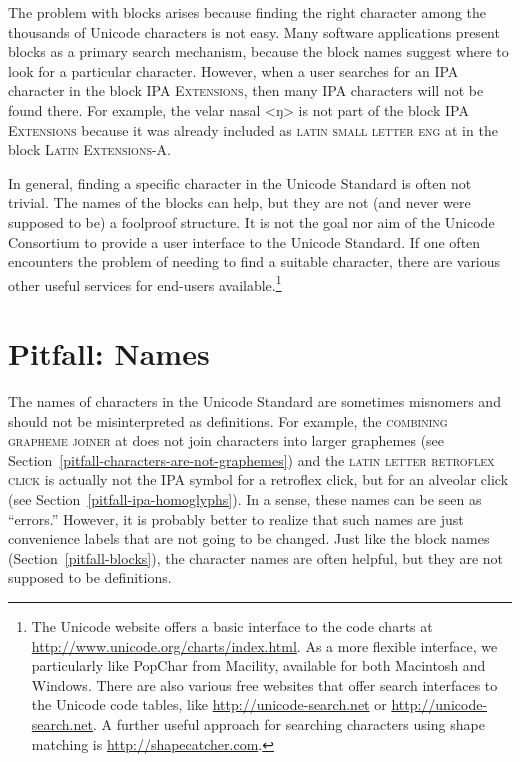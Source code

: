 The problem with blocks arises because finding the right character among the
thousands of Unicode characters is not easy. Many software applications present
blocks as a primary search mechanism, because the block names suggest where to
look for a particular character. However, when a user searches for an IPA
character in the block \textsc{IPA Extensions}, then many IPA characters will not
be found there. For example, the velar nasal <ŋ> is not part of the block
\textsc{IPA Extensions} because it was already included as \textsc{latin small letter
eng} at  in the block \textsc{Latin Extensions-A}.

In general, finding a specific character in the Unicode Standard is often not
trivial. The names of the blocks can help, but they are not (and never were supposed
to be) a foolproof structure. It is not the goal nor aim of the Unicode
Consortium to provide a user interface to the Unicode Standard. If one often
encounters the problem of needing to find a suitable character, there are
various other useful services for end-users available.\footnote{The Unicode
website offers a basic interface to the code charts at
\url{http://www.unicode.org/charts/index.html}. As a more flexible interface, we
particularly like PopChar from Macility, available for both Macintosh and
Windows. There are also various free websites that offer search interfaces
to the Unicode code tables, like \url{http://unicode-search.net} or
\url{http://unicode-search.net}. A further useful approach for searching characters
using shape matching is \url{http://shapecatcher.com}.}

\section{Pitfall: Names}
\label{pitfall-names}

The names of characters in the Unicode Standard are sometimes misnomers and
should not be misinterpreted as definitions. For example, the \textsc{combining
grapheme joiner} at  does not join characters into larger graphemes
(see Section~\ref{pitfall-characters-are-not-graphemes}) and the \textsc{latin
letter retroflex click}  is actually not the IPA symbol for a
retroflex click, but for an alveolar click (see
Section~\ref{pitfall-ipa-homoglyphs}). In a sense, these names can be seen as
``errors.'' However, it is probably better to realize that such names are just
convenience labels that are not going to be changed. Just like the block names
(Section~\ref{pitfall-blocks}), the character names are often helpful, but they
are not supposed to be definitions.

